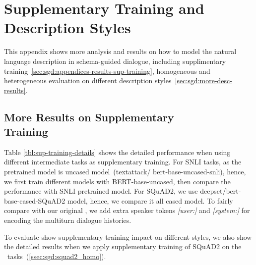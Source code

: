 \chapter{Supplementary Training and Description Styles}
\label{chap:appendix:schema-analysis}
This appendix shows more analysis and results on how to model the
natural language description in schema-guided dialogue, including
supplimentary
training~\autoref{sec:sgd:appendices-results-sup-training},
homogeneous and heterogeneous evaluation on different description
styles~\autoref{sec:sgd:more-desc-results}.

\section[More Results on Supplementary Training]{More Results on Supplementary \\Training}
\label{sec:sgd:appendices-results-sup-training}
Table \ref{tbl:sup-training-details} shows the detailed performance
when using different intermediate tasks as supplementary training.  For
SNLI tasks, as the pretrained model is uncased model~(textattack/
bert-base-uncased-snli), hence, we first train different models with
BERT-base-uncased, then compare the performance with SNLI pretrained
model. For SQuAD2, we use deepset/bert-base-cased-SQuAD2 model, hence,
we compare it all cased model. To fairly compare with our original
\CE, we add extra speaker tokens \emph{[user:]} and \emph{[system:]} for encoding
the multiturn dialogue histories.

To evaluate show supplementary training impact on different styles, we
also show the detailed results when we apply supplementary training of
SQuAD2 on the \NSL~tasks~(\autoref{ssec:sgd:squad2_homo}).

